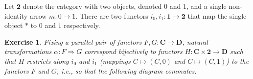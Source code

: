\documentclass[a5paper,oneside,11pt]{article}
\newtheorem{ex}{Exercise}
\newcommand\1{\mathord{\mathrm{1}}}
\newcommand\cat[1]{\mathbf{#1}}
\begin{document}
Let $\cat{2}$ denote the category with two objects, denoted $0$ and $1$, and a
single non-identity arrow $m : 0 \rightarrow 1$. There are two functors
$i_0, i_1 : \cat{1} \longrightarrow \cat{2}$ that map the single object $*$
to $0$ and $1$ respectively.
\begin{ex}
    Fixing a parallel pair of functors $F, G : \cat{C} \longrightarrow \cat{D}$, natural
    transformations $\alpha : F \Longrightarrow G$ correspond bijectively to functors
    $H : \cat{C} \times \cat{2} \longrightarrow \cat{D}$ such that $H$ restricts along
    $i_0$ and $i_1$ (mappings $C \mapsto (C, 0)$ and $C \mapsto (C, 1)$) to the functors
    $F$ and $G$, i.e., so that the following diagram commutes.
    \begin{figure}[H]
        \centering
    \end{figure}
\end{ex}
\end{document}
